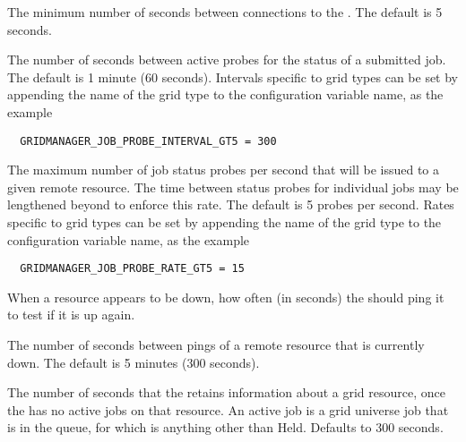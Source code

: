 \begin{description}
\label{param:GridmanagerContactScheddDelay}
\item[\Macro{GRIDMANAGER\_CONTACT\_SCHEDD\_DELAY}]
  The minimum number of
  seconds between connections to the . The default is 5 seconds.

\label{param:GridmanagerJobProbeInterval}
\item[\Macro{GRIDMANAGER\_JOB\_PROBE\_INTERVAL}]
  The number of seconds between
  active probes for the status of a submitted job.
  The default is 1 minute (60 seconds).
  Intervals specific to grid types can be set by appending the
  name of the grid type to the configuration variable name, as the example
  \begin{verbatim}
  GRIDMANAGER_JOB_PROBE_INTERVAL_GT5 = 300
  \end{verbatim}

\label{param:GridmanagerJobProbeRate}
\item[\Macro{GRIDMANAGER\_JOB\_PROBE\_RATE}]
  The maximum number of job status probes per second that will be
  issued to a given remote resource.
  The time between status probes for individual jobs may be lengthened
  beyond  to enforce this rate.
  The default is 5 probes per second.
  Rates specific to grid types can be set by appending the
  name of the grid type to the configuration variable name, as the example
  \begin{verbatim}
  GRIDMANAGER_JOB_PROBE_RATE_GT5 = 15
  \end{verbatim}

\label{param:GridmanagerResourceProbeInterval}
\item[\Macro{GRIDMANAGER\_RESOURCE\_PROBE\_INTERVAL}]
  When a resource appears to be down, how often (in seconds) the
  should ping it to test if it is up again.

\label{param:GridmanagerResourceProbeDelay}
\item[\Macro{GRIDMANAGER\_RESOURCE\_PROBE\_DELAY}]
  The number of seconds
  between pings of a remote resource that is currently down.
  The default is 5 minutes (300 seconds).

\label{param:GridmanagerEmptyResourceDelay}
\item[\Macro{GRIDMANAGER\_EMPTY\_RESOURCE\_DELAY}]
  The number of seconds
  that the  retains information about a grid
  resource, once the  has no active jobs
  on that resource.
  An active job is a grid universe job that is in the queue,
  for which  is anything other than Held. 
  Defaults to 300 seconds.


\end{description}
